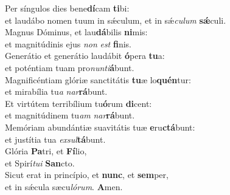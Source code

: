 \evenverse Per síngulos dies bene\textbf{dí}cam \textbf{ti}bi:~\*\\
\evenverse et laudábo nomen tuum in sǽculum, et in sǽ\textit{cu}\textit{lum} \textbf{sǽ}culi.\\
\oddverse Magnus Dóminus, et lau\textbf{dá}bilis \textbf{ni}mis:~\*\\
\oddverse et magnitúdinis ejus \textit{non} \textit{est} \textbf{fi}nis.\\
\evenverse Generátio et generátio laudábit \textbf{ó}pera \textbf{tu}a:~\*\\
\evenverse et poténtiam tuam pro\textit{nun}\textit{ti}\textbf{á}bunt.\\
\oddverse Magnificéntiam glóriæ sanctitátis \textbf{tu}æ lo\textbf{quén}tur:~\*\\
\oddverse et mirabília tu\textit{a} \textit{nar}\textbf{rá}bunt.\\
\evenverse Et virtútem terribílium tu\textbf{ó}rum \textbf{di}cent:~\*\\
\evenverse et magnitúdinem tu\textit{am} \textit{nar}\textbf{rá}bunt.\\
\oddverse Memóriam abundántiæ suavitátis tuæ \textbf{e}ru\textbf{ctá}bunt:~\*\\
\oddverse et justítia tua \textit{ex}\textit{sul}\textbf{tá}bunt.\\
\evenverse Glória \textbf{Pa}tri, et \textbf{Fí}lio,~\*\\
\evenverse et Spirí\textit{tu}\textit{i} \textbf{San}cto.\\
\oddverse Sicut erat in princípio, et \textbf{nunc}, et \textbf{sem}per,~\*\\
\oddverse et in sǽcula sæcu\textit{ló}\textit{rum}. \textbf{A}men.\\

